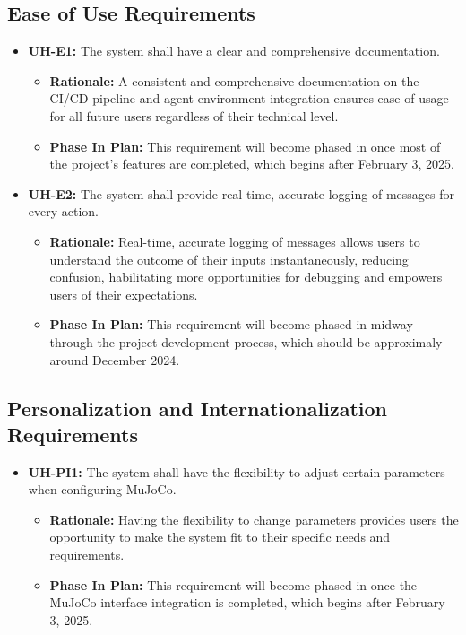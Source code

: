 \documentclass[12pt]{article}
\begin{document}
\subsection{Ease of Use Requirements}
\begin{itemize}
  \item \label{UH-E1} \textbf{UH-E1:} The system shall have a clear and comprehensive documentation.
  \begin{itemize}
    \item \textbf{Rationale:} A consistent and comprehensive documentation on the CI/CD pipeline and agent-environment integration ensures ease of usage for all future users regardless of their technical level.
    \item \textbf{Phase In Plan:} This requirement will become phased in once most of the project’s features are completed, which begins after February 3, 2025. 
  \end{itemize}
  \item \label{UH-E2} \textbf{UH-E2:} The system shall provide real-time, accurate logging of messages for every action.
  \begin{itemize}
    \item \textbf{Rationale:} Real-time, accurate logging of messages allows users to understand the outcome of their inputs instantaneously, reducing confusion, habilitating more opportunities for debugging and empowers users of their expectations.
    \item  \textbf{Phase In Plan:} This requirement will become phased in midway through the project development process, which should be approximaly around December 2024. 
  \end{itemize}
\end{itemize}


\subsection{Personalization and Internationalization Requirements}
\begin{itemize}
  \item \label{UH-PI1} \textbf{UH-PI1:} The system shall have the flexibility to adjust certain parameters when configuring MuJoCo.
  \begin{itemize}
    \item \textbf{Rationale:} Having the flexibility to change parameters provides users the opportunity to make the system fit to their specific needs and requirements.
    \item  \textbf{Phase In Plan:} This requirement will become phased in once the MuJoCo interface integration is completed, which begins after February 3, 2025.
  \end{itemize}
\end{itemize}
\end{document}
